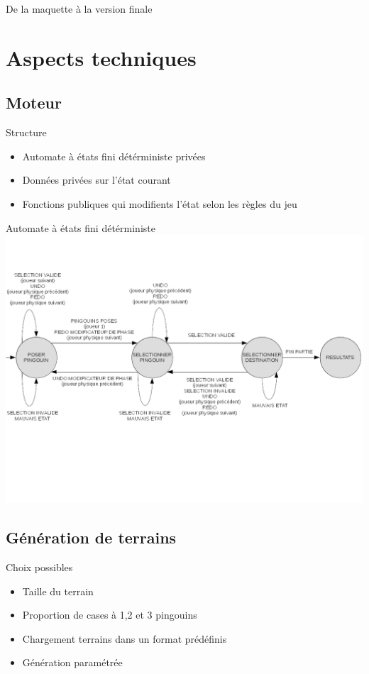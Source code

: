 \documentclass{beamer}
\begin{document}
\begin{frame}{De la maquette à la version finale}
\section{Aspects techniques}


\subsection{Moteur}

\begin{frame}{Structure}
\begin{block}{}
\begin{itemize}
\item<1-> Automate à états fini détérministe privées
\item<2-> Données privées sur l'état courant
\item<3-> Fonctions publiques qui modifients l'état selon les règles du jeu
\end{itemize}
\end{block}
\end{frame}

\begin{frame}{Automate à états fini détérministe}
\includegraphics[scale=0.4]{AFD}
\end{frame}

\subsection{Génération de terrains}

\begin{frame}{}
\begin{block}{Choix possibles}
\begin{itemize}
\item<1-> Taille du terrain
\item<2-> Proportion de cases à 1,2 et 3 pingouins
\item<3-> Chargement terrains dans un format prédéfinis
\item<4-> Génération paramétrée
\end{itemize}
\end{block}
\end{frame}


\end{frame}
\end{document}
